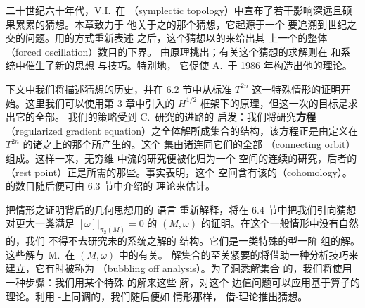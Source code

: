 
二十世纪六十年代，V.I.~\trArnold{}在\textbf{\trSymplecticTopology}%
（symplectic topology）中宣布了若干影响深远且硕果累累的猜想。本章致力于%
他关于\trSymplectic\trMapping{}之\trFixedPoint{}的那个猜想，它起源于一个%
要追溯到世纪之交的\trCelestialMechanics{}问题。用\trDynamics{}的方式重新表述%
之后，这个猜想以\trCompact\trSymplecticManifold{}的\trTopology{}来给出其%
上一个\trTimeDependent\trHamiltonianVectorField{}的整体%
\textbf{\trForcedOscillation}（forced oscillation）数目的下界。%
\trForcedOscillation{}由\trAction{}原理挑出；有关这个猜想的求解则在%
\trCalculusOfVariations{}和\trNonlinear\trElliptic{}系统中催生了新的思想%
与技巧。特别地，%
它促使 A.~\trFloer{}于 1986 年构造出他的\trHomology{}理论。

下文中我们将描述\trArnold{}猜想的历史，并在 6.2 节中从标准\trTorus{}%
$T^{2n}$ 这一特殊情形的证明开始。这里我们可以使用第 3 章中引入的 $H^{1/2}$%
框架下的\trAction{}原理，但这一次的目标是求出它的全部\trCriticalPoint。%
我们的策略受到 C.~\trConley{}研究\trDynamicalSystem{}的\trTopology{}进路的%
启发：我们将研究\textbf{\trRegularization\trGradient{}方程}（regularized %
gradient equation）之全体\trBounded{}解所成集合的结构，该方程正是由定义在%
$T^{2n}$ 的诸\trContractible\trLoop{}之上的那个\trActionFunctional{}所产生的。这个%
\trInvariant{}集由诸\trCriticalPoint{}连同它们的全部%
\textbf{\trConnectingOrbit}（connecting orbit）组成。这样一来，无穷维%
\trLoopSpace{}中\trGradient{}流的研究便被化归为一个\trCompact\trMetric{}%
空间的\trGradientLike{}连续\trFlow{}的研究，后者的\textbf{\trRestPoint}%
（rest point）正是所需的那些\trCriticalPoint。事实表明，这个\trCompact{}%
空间含有该\trTorus{}的\textbf{\trCohomology}（cohomology）。\trRestPoint%
的数目随后便可由 6.3 节中介绍的\trLjusternik-\trSchnirelman{}理论来估计。

把\trTorus{}情形之证明背后的几何思想用\trPartialDifferentialEquation{}的%
语言%
重新解释，将在 6.4 节中把我们引向\trArnold{}猜想对更大一类满足%
$[\omega]\big|_{\pi_{2}(M)}=0$ 的\trCompact\trSymplecticManifold{}%
$(M,\omega)$ 的证明。在这个一般情形中没有自然的\trRegularization，我们%
不得不去研究未\trRegularization{}的\trGradient{}系统之\trBounded{}解的%
结构。它们是一类特殊的\trCauchyRiemann{}型一阶\trElliptic%
\trPartialDifferentialEquation{}组的\trSmooth{}解。这些解与%
M.~\trGromov{}在 $(M,\omega)$ 中的\trPseudoholomorphic\trCurve{}有关。%
解集合的至关紧要的\trCompactness{}将借助一种分析技巧来建立，它有时被称为%
\textbf{\trBubblingOffAnalysis}（bubbling off analysis）。为了洞悉解集合%
的\trTopology，我们将使用一种\trApproximation{}步骤：我们用某个特殊%
\trElliptic\trBoundaryValueProblem{}的解来\trApproximation{}这些%
\trBounded{}解，对这个%
边值问题可以应用基于\trCauchyRiemann{}算子的\trFredholm{}理论。利用%
\trAlexander-\trSpanier{}上同调的\trContinuity，我们随后便如%
\trTorus{}情形那样，%
借\trLjusternik-\trSchnirelman{}理论推出\trArnold{}猜想。

